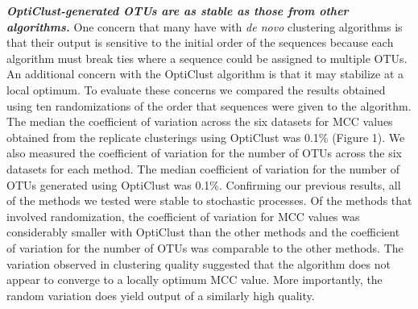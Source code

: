 \documentclass[11pt,]{article}
\begin{document}
\textbf{\emph{OptiClust-generated OTUs are as stable as those from other
algorithms.}} One concern that many have with \emph{de novo} clustering
algorithms is that their output is sensitive to the initial order of the
sequences because each algorithm must break ties where a sequence could
be assigned to multiple OTUs. An additional concern with the OptiClust
algorithm is that it may stabilize at a local optimum. To evaluate these
concerns we compared the results obtained using ten randomizations of
the order that sequences were given to the algorithm. The median the
coefficient of variation across the six datasets for MCC values obtained
from the replicate clusterings using OptiClust was 0.1\% (Figure 1). We
also measured the coefficient of variation for the number of OTUs across
the six datasets for each method. The median coefficient of variation
for the number of OTUs generated using OptiClust was 0.1\%. Confirming
our previous results, all of the methods we tested were stable to
stochastic processes. Of the methods that involved randomization, the
coefficient of variation for MCC values was considerably smaller with
OptiClust than the other methods and the coefficient of variation for
the number of OTUs was comparable to the other methods. The variation
observed in clustering quality suggested that the algorithm does not
appear to converge to a locally optimum MCC value. More importantly, the
random variation does yield output of a similarly high quality.
\end{document}
